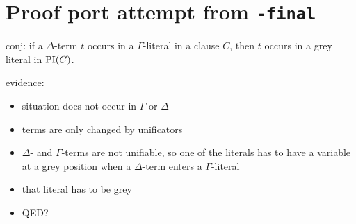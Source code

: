 \documentclass[,%
	draft=false,%
	numbers=noendperiod
	12pt,
	a4paper,
	oneside,%
	openany,
]{memoir}
\begin{document}
\section{ Proof port attempt from \texttt{-final} }


conj: if a $\Delta$-term $t$ occurs in a $\Gamma$-literal in a clause $C$, then $t$ occurs in a grey literal in $\operatorname{PI}(C)$.

evidence:
\begin{itemize}
	\item situation does not occur in $\Gamma$ or $\Delta$
	\item terms are only changed by unificators
	\item $\Delta$- and $\Gamma$-terms are not unifiable, so one of the literals has to have a variable at a grey position when a $\Delta$-term enters a $\Gamma$-literal
	\item that literal has to be grey
	\item QED?
\end{itemize}
\end{document}
